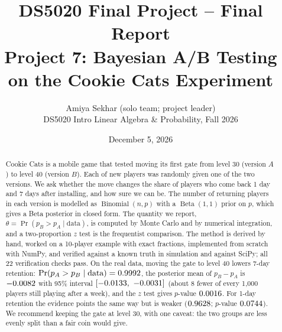 \documentclass[11pt]{article}
\title{DS5020 Final Project -- Final Report\\
  \large Project 7: Bayesian A/B Testing on the Cookie Cats Experiment}
\author{Amiya Sekhar (solo team; project leader)\\
  DS5020 Intro Linear Algebra \& Probability, Fall 2026}
\date{December 5, 2026}
\theoremstyle{definition}
\theoremstyle{remark}
\renewcommand{\Pr}{\operatorname{Pr}}
\newcommand{\Bin}{\operatorname{Binomial}}
\newcommand{\Betad}{\operatorname{Beta}}
\newcommand{\data}{\text{data}}
\begin{document}
\maketitle

\begin{abstract}
Cookie Cats is a mobile game that tested moving its first gate from level 30 (version $A$) to level 40
(version $B$). Each of \realRaw{} new players was randomly given one of the two versions. We ask whether the move
changes the share of players who come back 1 day and 7 days after installing, and how sure we can be.
The number of returning players in each version is modelled as $\Bin(n,p)$ with a $\Betad(1,1)$ prior on $p$,
which gives a Beta posterior in closed form. The quantity we report, $\theta=\Pr(p_B>p_A\mid\data)$, is computed by
Monte Carlo and by numerical integration, and a two-proportion $z$ test is the frequentist comparison.
The method is derived by hand, worked on a 10-player example with exact fractions, implemented from scratch with
NumPy, and verified against a known truth in simulation and against SciPy; all 22 verification checks pass.
On the real data, moving the gate to level 40 lowers 7-day retention: $\Pr(p_A>p_B\mid\data)=\realSevenThetaA$,
the posterior mean of $p_B-p_A$ is $-0.0082$ with 95\% interval $[-0.0133,\ -0.0031]$ (about 8 fewer
of every 1{,}000 players still playing after a week), and the $z$ test gives $p$-value $0.0016$. For 1-day
retention the evidence points the same way but is weaker ($0.9628$; $p$-value $0.0744$). We recommend
keeping the gate at level 30, with one caveat: the two groups are less evenly split than a fair coin would give.
\end{abstract}
\end{document}
